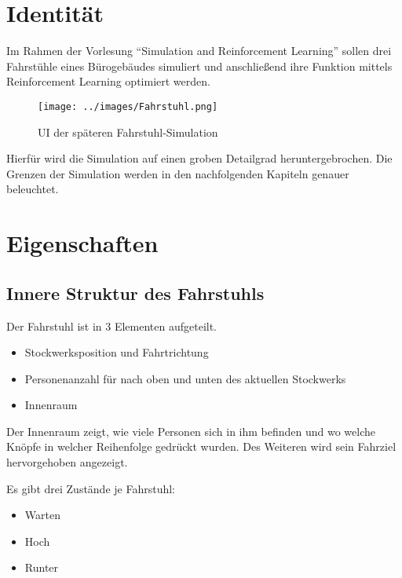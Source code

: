 \newpage

\hypertarget{identituxe4t}{%
\chapter{Identität}\label{identituxe4t}}

Im Rahmen der Vorlesung ``Simulation and Reinforcement Learning'' sollen
drei Fahrstühle eines Bürogebäudes simuliert und anschließend ihre
Funktion mittels Reinforcement Learning optimiert werden.

\begin{figure}
\centering
\texttt{[image: ../images/Fahrstuhl.png]}
\caption{UI der späteren Fahrstuhl-Simulation}
\end{figure}

Hierfür wird die Simulation auf einen groben Detailgrad
heruntergebrochen. Die Grenzen der Simulation werden in den
nachfolgenden Kapiteln genauer beleuchtet.

\hypertarget{eigenschaften}{%
\chapter{Eigenschaften}\label{eigenschaften}}

\hypertarget{innere-struktur-des-fahrstuhls}{%
\section{Innere Struktur des
Fahrstuhls}\label{innere-struktur-des-fahrstuhls}}

Der Fahrstuhl ist in 3 Elementen aufgeteilt.

\begin{itemize}
\tightlist
\item
  Stockwerksposition und Fahrtrichtung
\item
  Personenanzahl für nach oben und unten des aktuellen Stockwerks
\item
  Innenraum
\end{itemize}

Der Innenraum zeigt, wie viele Personen sich in ihm befinden und wo
welche Knöpfe in welcher Reihenfolge gedrückt wurden. Des Weiteren wird
sein Fahrziel hervorgehoben angezeigt.

Es gibt drei Zustände je Fahrstuhl:

\begin{itemize}
\tightlist
\item
  Warten
\item
  Hoch
\item
  Runter
\end{itemize}

